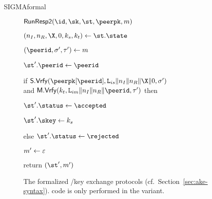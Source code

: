 \begin{collect*}{SIGMAformal}{}{}{}{}
\begin{figure}[tp]
\begin{minipage}[t]{0.49\textwidth}
		\begin{algorithm}{$\RunRespII(\id,\sk,\st,\peerpk,m)$}
			\item $(\nonce_I,\nonce_R,\X,\Y,\ks,\kt) \gets \st.\state$ \newline
			\item $(\peerid,\sigma',\tau')\gets m$ \newline
			\item $\st'.\peerid\gets \peerid$
			\item if $\SIGScheme.\SIGVerify(\peerpk[\peerid], \labelis\|\nonce_I\|\nonce_R\|\X\|\Y, \sigma')$\\
				and $\MACScheme.\MACVerify(\kt, \labelim\|\nonce_I\|\nonce_R\|\peerid, \tau')$ then
			\item \hindent $\st'.\status \gets \accepted$
			\item \hindent $\st'.\skey \gets \ks$
			\item else $\st'.\status \gets \rejected$
			\item $m' \gets \varepsilon$
			\item return $(\st', m')$
		\end{algorithm}
	\end{minipage}
  	\caption{%
		The formalized \SIGMA/\SIGMAI key exchange protocols (cf.\ Section~\ref{sec:ake-syntax}).
		 code is only performed in the \SIGMAI variant.
  	}
  	\label{fig:sigma-formal}
\end{figure}
\end{collect*}



